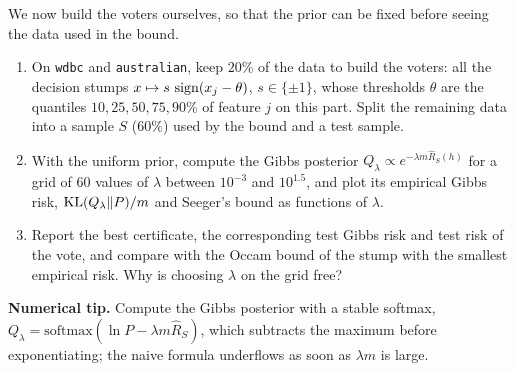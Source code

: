 \documentclass[11pt]{article}
\newcommand{\code}[1]{\texttt{#1}}
\begin{document}
We now build the voters ourselves, so that the prior can be fixed before seeing the data used in the bound.
\begin{enumerate}
\item On \code{wdbc} and \code{australian}, keep $20\%$ of the data to build the voters: all the decision stumps
      $x\mapsto s\,\operatorname{sign}(x_j-\theta)$, $s\in\{\pm1\}$, whose thresholds $\theta$ are the quantiles $10,25,50,75,90\%$ of
      feature $j$ on this part. Split the remaining data into a sample $S$ ($60\%$) used by the bound and a test sample.
\item With the uniform prior, compute the Gibbs posterior $Q_\lambda\propto e^{-\lambda m\widehat R_S(h)}$ for a grid of
      $60$ values of $\lambda$ between $10^{-3}$ and $10^{1.5}$, and plot its empirical Gibbs risk, $\operatorname{KL}(Q_\lambda\|P)/m$ and
      Seeger's bound as functions of $\lambda$.
\item Report the best certificate, the corresponding test Gibbs risk and test risk of the vote, and compare with
      the Occam bound of the stump with the smallest empirical risk. Why is choosing $\lambda$ on the grid free?
\end{enumerate}

\begin{tip}
\textbf{Numerical tip.} Compute the Gibbs posterior with a stable softmax, $Q_\lambda=\mathrm{softmax}(\ln P-\lambda m\widehat R_S)$,
which subtracts the maximum before exponentiating; the naive formula underflows as soon as $\lambda m$ is large.
\end{tip}
\end{document}
